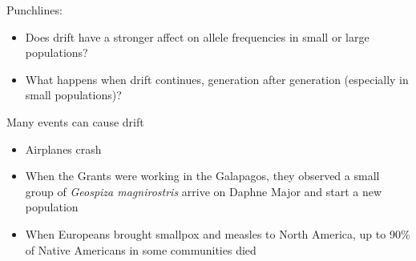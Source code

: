 \begin{frame}
    Punchlines:

    \begin{itemize}
        \item Does drift have a stronger affect on allele frequencies in small
            or large populations?

        \item What happens when drift continues, generation after generation
            (especially in small populations)?
    \end{itemize}
\end{frame}

\begin{frame}
    Many events can cause drift

    \begin{itemize}
        \item Airplanes crash


        \item When the Grants were working in the Galapagos, they observed a
            small group of \emph{Geospiza magnirostris} arrive on Daphne Major
            and start a new population


        \item When Europeans brought smallpox and measles to North America, up
            to 90\% of Native Americans in some communities died

    \end{itemize}
\end{frame}


